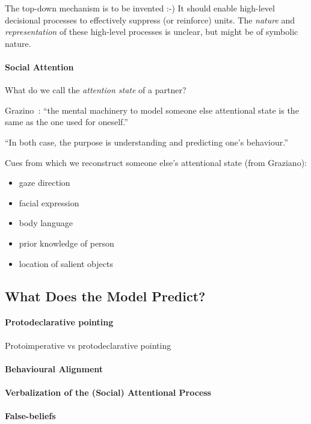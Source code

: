 \documentclass[a4paper]{article}
\begin{document}
The top-down mechanism is to be invented :-)
It should enable high-level decisional processes to effectively suppress (or
reinforce) units. The \emph{nature} and \emph{representation} of these
high-level processes is unclear, but might be of symbolic nature.



\paragraph{Social Attention}

What do we call the \emph{attention state} of a partner?


Grazino~\cite{graziano2013consciousness}: ``the mental machinery to model
someone else attentional state is the same as the one used for oneself.''

``In both case, the purpose is understanding and predicting one's behaviour.''

Cues from which we reconstruct someone else's attentional state (from Graziano):
\begin{itemize}
    \item gaze direction
    \item facial expression
    \item body language
    \item prior knowledge of person
    \item location of salient objects
\end{itemize}

\subsection{What Does the Model Predict?}

\paragraph{Protodeclarative pointing}

Protoimperative vs protodeclarative pointing~\cite{baron1986perceptual}

\paragraph{Behavioural Alignment}
\paragraph{Verbalization of the (Social) Attentional Process}
\paragraph{False-beliefs}
\end{document}
